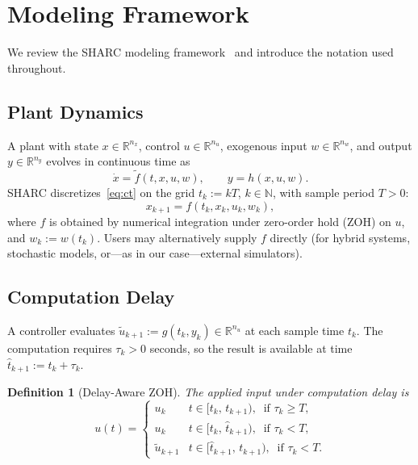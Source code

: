 \documentclass[conference]{IEEEtran}
\newcommand{\R}{\mathbb{R}}
\newcommand{\N}{\mathbb{N}}
\newtheorem{definition}{Definition}
\begin{document}
\section{Modeling Framework}\label{sec:model}

We review the SHARC modeling framework~\cite{wintz2025sharc} and
introduce the notation used throughout.

\subsection{Plant Dynamics}

A plant with state $x \in \R^{n_x}$, control $u \in \R^{n_u}$,
exogenous input $w \in \R^{n_w}$, and output $y \in \R^{n_y}$ evolves
in continuous time as
\begin{equation}\label{eq:ct}
  \dot{x} = \tilde{f}(t, x, u, w), \qquad y = h(x, u, w).
\end{equation}
SHARC discretizes~\eqref{eq:ct} on the grid $t_k := kT$, $k \in \N$,
with sample period $T > 0$:
\begin{equation}\label{eq:disc}
  x_{k+1} = f(t_k, x_k, u_k, w_k),
\end{equation}
where $f$ is obtained by numerical integration under zero-order hold
(ZOH) on $u$, and $w_k := w(t_k)$.  Users may alternatively supply $f$
directly (for hybrid systems, stochastic models, or---as in our
case---external simulators).

\subsection{Computation Delay}\label{sec:delay_model}

A controller evaluates
$\tilde{u}_{k+1} := g(t_k, y_k) \in \R^{n_u}$
at each sample time $t_k$.  The computation requires $\tau_k > 0$
seconds, so the result is available at time
$\hat{t}_{k+1} := t_k + \tau_k$.

\begin{definition}[Delay-Aware ZOH]\label{def:zoh}
  The applied input under computation delay is
  \begin{equation}\label{eq:zoh_delay}
    u(t) = \begin{cases}
      u_k & t \in [t_k,\, t_{k+1}),
        \;\;\text{if } \tau_k \geq T, \\[2pt]
      u_k & t \in [t_k,\, \hat{t}_{k+1}),
        \;\;\text{if } \tau_k < T, \\[2pt]
      \tilde{u}_{k+1} & t \in [\hat{t}_{k+1},\, t_{k+1}),
        \;\;\text{if } \tau_k < T.
    \end{cases}
  \end{equation}
\end{definition}
\end{document}
